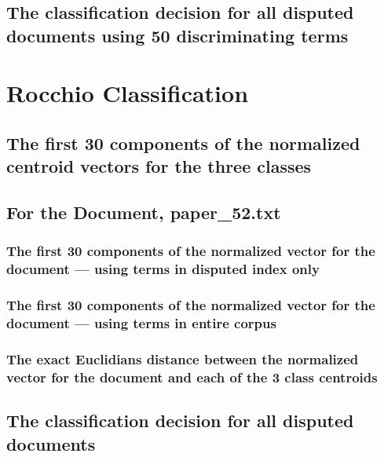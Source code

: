 \documentclass[12pt, letterpaper]{article}
\begin{document}
    \newpage

    \subsection{The classification decision for all disputed documents using
    50 discriminating terms}
    

    \newpage

    \section{Rocchio Classification}

    \subsection{The first 30 components of the normalized centroid vectors
    for the three classes}
    

    \newpage

    \subsection{For the Document, paper\_52.txt}

    \subsubsection{The first 30 components of the normalized vector for the
    document --- using terms in disputed index only}
    

    \subsubsection{The first 30 components of the normalized vector for the
    document --- using terms in entire corpus}
    

    \subsubsection{The exact Euclidians distance between the normalized vector
    for the document and each of the 3 class centroids}
    

    \newpage

    \subsection{The classification decision for all disputed documents}
    
\end{document}
